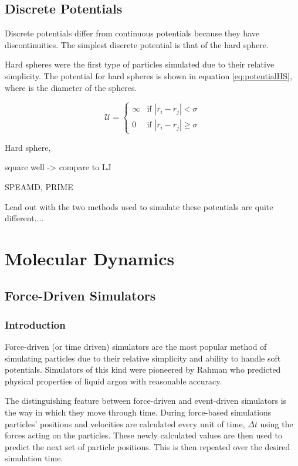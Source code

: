 \documentclass[12pt]{UoAthesis}
\begin{document}
\section{Discrete Potentials}

Discrete potentials differ from continuous potentials because they
have discontinuities.  The simplest discrete potential is that of the
hard sphere.

Hard spheres were the first type of particles simulated
\cite{Alder1957} due to their relative simplicity.  The potential for
hard spheres is shown in equation \eqref{eq:potentialHS}, where \sigma
is the diameter of the spheres.

\begin{equation}
  \label{eq:potentialHS}
  \mathcal{U} = 
  \begin{cases}
    \infty &\text{if } |r_i - r_j| < \sigma \\
    0 &\text{if } |r_i - r_j| \geq \sigma
  \end{cases}
\end{equation}



Hard sphere,

square well -> compare to LJ

SPEAMD, PRIME

Lead out with the two methods used to simulate these potentials are quite different....

\chapter{Molecular Dynamics}
\section{Force-Driven Simulators}
\subsection{Introduction} 
Force-driven (or time driven) simulators are the most popular method
of simulating particles due to their relative simplicity and ability
to handle soft potentials. Simulators of this kind were pioneered by
Rahman \cite{Rahman1964} who predicted physical properties of liquid
argon with reasonable accuracy.

The distinguishing feature between force-driven and event-driven
simulators is the way in which they move through time. During
force-based simulations particles' positions and velocities are
calculated every unit of time, $\Delta t$ using the forces acting on
the particles. These newly calculated values are then used to predict
the next set of particle positions. This is then repeated over the
desired simulation time.
\end{document}
